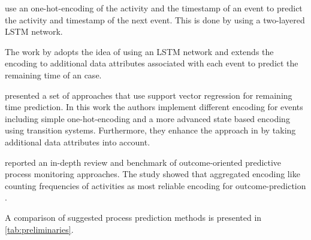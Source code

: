 \citeauthor{DBLP:conf/caise/TaxVRD17} use an one-hot-encoding of the activity and the timestamp of an event to predict the activity and timestamp of the next event.
This is done by using a two-layered LSTM network\cite{DBLP:conf/caise/TaxVRD17}.


The work by \citeauthor{DBLP:conf/ssci/NavarinVPS17} adopts the idea of using an LSTM network \cite{DBLP:conf/caise/TaxVRD17} and extends the encoding to additional data attributes associated with each event\cite{DBLP:conf/ssci/NavarinVPS17} to predict the remaining time of an case.

\citeauthor{DBLP:journals/computing/PolatoSBL18} presented a set of approaches that use support vector regression for remaining time prediction\cite{DBLP:journals/computing/PolatoSBL18}.
In this work the authors implement different encoding for events including simple one-hot-encoding and a more advanced state based encoding using transition systems.
Furthermore, they enhance the approach in  \cite{DBLP:journals/is/AalstSS11} by taking additional data attributes into account.

\citeauthor{DBLP:journals/tkdd/TeinemaaDRM19} reported an in-depth review and benchmark of outcome-oriented predictive process monitoring approaches.
The study showed that aggregated encoding like counting frequencies of activities as most reliable encoding for outcome-prediction \cite{DBLP:journals/tkdd/TeinemaaDRM19}.

A comparison of suggested process prediction methods is presented in \ref{tab:preliminaries}.


